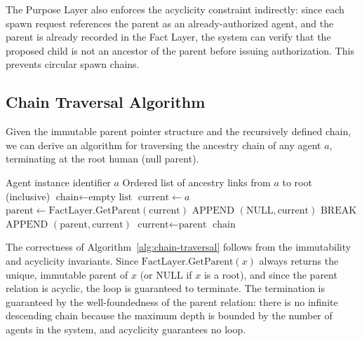 The Purpose Layer also enforces the acyclicity constraint indirectly: since each spawn request references the parent as an already-authorized agent, and the parent is already recorded in the Fact Layer, the system can verify that the proposed child is not an ancestor of the parent before issuing authorization. This prevents circular spawn chains.

\subsection{Chain Traversal Algorithm}
\label{sec:chain-traversal-algorithm}

Given the immutable parent pointer structure and the recursively defined chain, we can derive an algorithm for traversing the ancestry chain of any agent $a$, terminating at the root human (null parent).

\begin{algorithm}
\label{alg:chain-traversal}
\begin{algorithmic}
\REQUIRE Agent instance identifier $a$
\ENSURE Ordered list of ancestry links from $a$ to root (inclusive)
\STATE $\text{chain} \leftarrow \text{empty list}$
\STATE $\text{current} \leftarrow a$
    \STATE $\text{parent} \leftarrow \text{FactLayer.GetParent}(\text{current})$
        \STATE $\text{APPEND } (\text{NULL}, \text{current})$ 
        \STATE $\text{BREAK}$
    \ENDIF
    \STATE $\text{APPEND } (\text{parent}, \text{current})$
    \STATE $\text{current} \leftarrow \text{parent}$
\ENDWHILE
\RETURN $\text{chain}$
\end{algorithmic}
\end{algorithm}

The correctness of Algorithm~\ref{alg:chain-traversal} follows from the immutability and acyclicity invariants. Since $\text{FactLayer.GetParent}(x)$ always returns the unique, immutable parent of $x$ (or NULL if $x$ is a root), and since the parent relation is acyclic, the loop is guaranteed to terminate. The termination is guaranteed by the well-foundedness of the parent relation: there is no infinite descending chain because the maximum depth is bounded by the number of agents in the system, and acyclicity guarantees no loop.

